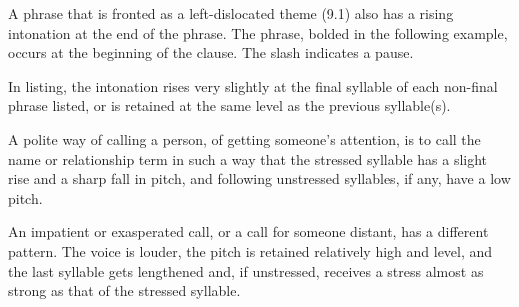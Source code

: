 A phrase that is fronted as a left-dislocated theme (9.1) also has a rising intonation at the end of the phrase.  The phrase, bolded in the following example, occurs at the beginning of the clause.  The slash indicates a pause.

 

  
In listing, the intonation rises very slightly at the final syllable of each non-final phrase listed, or is retained at the same level as the previous syllable(s).


 

A polite way of calling a person, of getting someone's attention, is to call the name or relationship term in such a way that the stressed syllable has a slight rise and a sharp fall in pitch, and following unstressed syllables, if any, have a low pitch.




An impatient or exasperated call, or a call for someone distant, has a different pattern.  The voice is louder, the pitch is retained relatively high and level, and the last syllable gets lengthened and, if unstressed, receives a stress almost as strong as that of the stressed syllable.

 

